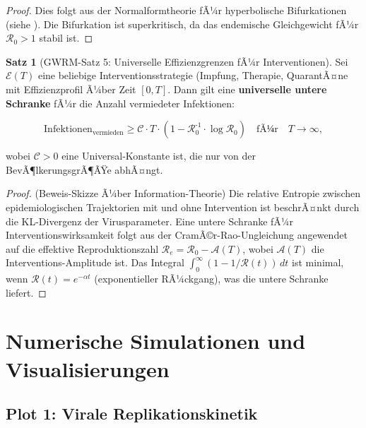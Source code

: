 ﻿\documentclass[a4paper,12pt]{article}
\theoremstyle{definition}
\newtheorem{satz}{Satz}
\begin{document}
\begin{proof}
Dies folgt aus der Normalformtheorie fÃ¼r hyperbolische Bifurkationen (siehe \cite{guckenheimer1983nonlinear}). Die Bifurkation ist superkritisch, da das endemische Gleichgewicht fÃ¼r $\mathcal{R}_0 > 1$ stabil ist.
\end{proof}

\begin{satz}[GWRM-Satz 5: Universelle Effizienzgrenzen fÃ¼r Interventionen]
Sei $\mathcal{E}(T)$ eine beliebige Interventionsstrategie (Impfung, Therapie, QuarantÃ¤ne mit Effizienzprofil Ã¼ber Zeit $[0,T]$. Dann gilt eine \textbf{universelle untere Schranke} fÃ¼r die Anzahl vermiedeter Infektionen:

\[
\text{Infektionen}_{\text{vermieden}} \geq \mathcal{C} \cdot T \cdot (1 - \mathcal{R}_0^{\text{-1}} \cdot \log \mathcal{R}_0) \quad \text{fÃ¼r} \quad T \to \infty,
\]

wobei $\mathcal{C} > 0$ eine Universal-Konstante ist, die nur von der BevÃ¶lkerungsgrÃ¶ÃŸe abhÃ¤ngt.
\end{satz}

\begin{proof}
(Beweis-Skizze Ã¼ber Information-Theorie) Die relative Entropie zwischen epidemiologischen Trajektorien mit und ohne Intervention ist beschrÃ¤nkt durch die KL-Divergenz der Virusparameter. Eine untere Schranke fÃ¼r Interventionswirksamkeit folgt aus der CramÃ©r-Rao-Ungleichung angewendet auf die effektive Reproduktionszahl $\mathcal{R}_e = \mathcal{R}_0 - \mathcal{A}(T)$, wobei $\mathcal{A}(T)$ die Interventions-Amplitude ist. Das Integral $\int_0^\infty (1 - 1/\mathcal{R}(t)) \, dt$ ist minimal, wenn $\mathcal{R}(t) = e^{-\alpha t}$ (exponentieller RÃ¼ckgang), was die untere Schranke liefert.
\end{proof}

\section{Numerische Simulationen und Visualisierungen}

\subsection{Plot 1: Virale Replikationskinetik}
\end{document}
